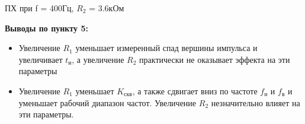 \documentclass[a4paper,14pt]{extarticle}
\begin{document}







    


    ПХ при f = 400Гц, $R_2$ = 3.6кОм 

    \textbf{Выводы по пункту 5:}
    \vspace{-6ex}
    \begin{singlespace}
        \begin{itemize}
           \item Увеличение $R_1$ уменьшает измеренный спад вершины импульса и увеличивает 
           $t_{\text{и}}$, а увеличение $R_2$ практически не оказывает эффекта на эти параметры 
           \item Увеличение $R_1$ уменьшает $K_{\text{скв}}$, а также сдвигает вниз по 
           частоте $f_{\text{н}}$ и $f_{\text{в}}$ и уменьшает рабочий диапазон частот. 
           Увеличение $R_2$ незначительно влияет на эти параметры.
        \end{itemize}
    \end{singlespace}
\end{document}
